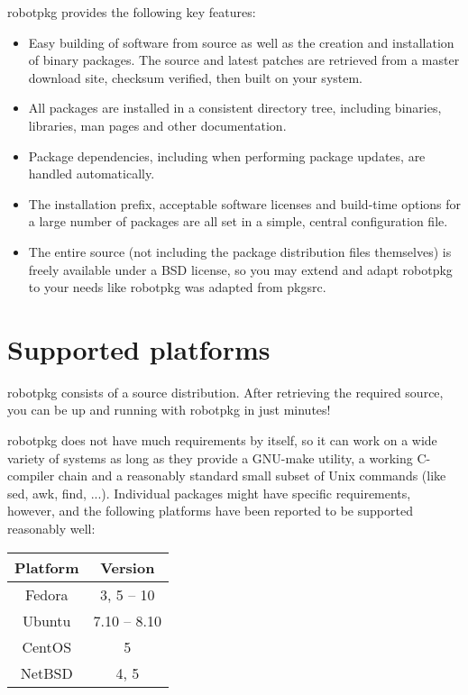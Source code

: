 robotpkg provides the following key features:

\begin{itemize}

   \item Easy building of software  from  source as well   as the creation  and
   installation of binary packages. The source and latest patches are retrieved
   from a master download site, checksum verified, then built on your system.

   \item All  packages are installed in a  consistent directory tree, including
   binaries, libraries, man pages and other documentation.

   \item  Package dependencies, including  when performing package updates, are
   handled automatically.

   \item The installation prefix, acceptable  software licenses and  build-time
   options  for a large  number of packages  are all set  in  a simple, central
   configuration file.

   \item   The entire  source (not   including  the package distribution  files
   themselves) is freely available  under a BSD license,  so you may extend and
   adapt robotpkg to your needs like robotpkg was adapted from pkgsrc.

\end{itemize}

\section{Supported platforms} %

robotpkg consists of  a   source distribution. After retrieving    the required
source, you can be up and running with robotpkg in just minutes!

robotpkg does  not have much requirements by  itself, so it  can work on a wide
variety of  systems  as long as  they  provide  a GNU-make   utility, a working
C-compiler chain and a reasonably standard small  subset of Unix commands (like
sed,  awk, find, ...).  Individual  packages might  have specific requirements,
however,  and the following  platforms  have   been reported  to  be  supported
reasonably well:

\begin{center}\begin{tabular}{cc}
\hline
Platform & Version \\
\hline
\hline
Fedora & 3, 5 -- 10\\
Ubuntu & 7.10 -- 8.10\\
CentOS & 5\\
NetBSD & 4, 5\\
\hline
\end{tabular}\end{center}


